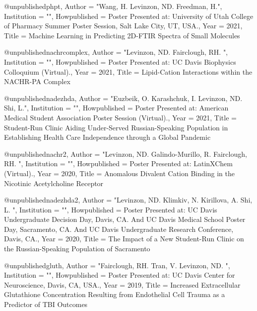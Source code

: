 @unpublished{phpt,
  Author = "{Wang, H. Levinzon, ND. Freedman, H.}",
  Institution = "{}",
  Howpublished = {Poster Presented at: University of Utah College of Pharmacy Summer Poster Session, Salt Lake City, UT, USA.},
  Year = {2021},
  Title = {Machine Learning in Predicting 2D-FTIR Spectra of Small Molecules}
}

@unpublished{nachrcomplex,
  Author = "{Levinzon, ND. Fairclough, RH. }",
  Institution = "{}",
  Howpublished = {Poster Presented at: UC Davis Biophysics Colloquium (Virtual).},
  Year = {2021},
  Title = {Lipid-Cation Interactions within the NACHR-PA Complex}
}

@unpublished{nadezhda,
  Author = "{Euzbeik, O. Karashchuk, I. Levinzon, ND. Shi, L.}",
  Institution = "{}",
  Howpublished = {Poster Presented at: American Medical Student Association Poster Session (Virtual).},
  Year = {2021},
  Title = {Student-Run Clinic Aiding Under-Served Russian-Speaking Population in Establishing Health Care Independence through a Global Pandemic}
}

@unpublished{nachr2,
  Author = "{Levinzon, ND. Galindo-Murillo, R.  Fairclough, RH. }",
  Institution = "{}",
  Howpublished = {Poster Presented at: LatinXChem (Virtual).},
  Year = {2020},
  Title = {Anomalous Divalent Cation Binding in the Nicotinic Acetylcholine Receptor}
}

@unpublished{nadezhda2,
  Author = "{Levinzon, ND. Klimkiv, N. Kirillova, A. Shi, L. }",
  Institution = "{}",
  Howpublished = {Poster Presented at: UC Davis Undergraduate Decision Day, Davis, CA. And UC Davis Medical School Poster Day, Sacramento, CA. And UC Davis Undergraduate Research Conference, Davis, CA.},
  Year = {2020},
  Title = {The Impact of a New Student-Run Clinic on the Russian-Speaking Population of Sacramento}
}

@unpublished{gluth,
  Author = "{Fairclough, RH. Tran, V. Levinzon, ND. }",
  Institution = "{}",
  Howpublished = {Poster Presented at: UC Davis Center for Neuroscience, Davis, CA, USA.},
  Year = {2019},
  Title = {Increased Extracellular Glutathione Concentration Resulting from Endothelial Cell Trauma as a Predictor of TBI Outcomes}
}
